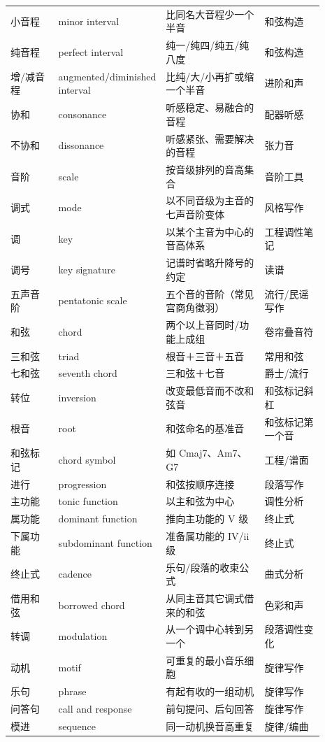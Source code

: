 \begin{center}
\begin{longtable}{p{0.16\linewidth}p{0.20\linewidth}p{0.33\linewidth}p{0.20\linewidth}}
小音程 & minor interval & 比同名大音程少一个半音 & 和弦构造 \\
纯音程 & perfect interval & 纯一/纯四/纯五/纯八度 & 和弦构造 \\
增/减音程 & augmented/\allowbreak diminished interval & 比纯/大/小再扩或缩一个半音 & 进阶和声 \\
协和 & consonance & 听感稳定、易融合的音程 & 配器听感 \\
不协和 & dissonance & 听感紧张、需要解决的音程 & 张力音 \\
音阶 & scale & 按音级排列的音高集合 & 音阶工具 \\
调式 & mode & 以不同音级为主音的七声音阶变体 & 风格写作 \\
调 & key & 以某个主音为中心的音高体系 & 工程调性笔记 \\
调号 & key signature & 记谱时省略升降号的约定 & 读谱 \\
五声音阶 & pentatonic scale & 五个音的音阶（常见宫商角徵羽） & 流行/民谣写作 \\
和弦 & chord & 两个以上音同时/功能上成组 & 卷帘叠音符 \\
三和弦 & triad & 根音＋三音＋五音 & 常用和弦 \\
七和弦 & seventh chord & 三和弦＋七音 & 爵士/流行 \\
转位 & inversion & 改变最低音而不改和弦音 & 和弦标记斜杠 \\
根音 & root & 和弦命名的基准音 & 和弦标记第一个音 \\
和弦标记 & chord symbol & 如 Cmaj7、Am7、G7 & 工程/谱面 \\
进行 & progression & 和弦按顺序连接 & 段落写作 \\
主功能 & tonic function & 以主和弦为中心 & 调性分析 \\
属功能 & dominant function & 推向主功能的 V 级 & 终止式 \\
下属功能 & subdominant function & 准备属功能的 IV/ii 级 & 终止式 \\
终止式 & cadence & 乐句/段落的收束公式 & 曲式分析 \\
借用和弦 & borrowed chord & 从同主音其它调式借来的和弦 & 色彩和声 \\
转调 & modulation & 从一个调中心转到另一个 & 段落调性变化 \\
动机 & motif & 可重复的最小音乐细胞 & 旋律写作 \\
乐句 & phrase & 有起有收的一组动机 & 旋律写作 \\
问答句 & call and response & 前句提问、后句回答 & 旋律写作 \\
模进 & sequence & 同一动机换音高重复 & 旋律/编曲 \\

\end{longtable}
\end{center}
